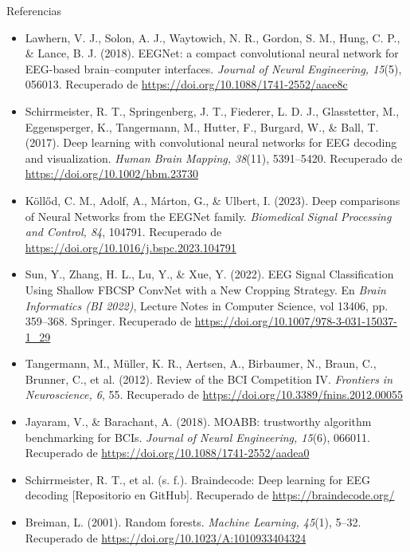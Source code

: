 \documentclass{beamer}
\begin{document}
\begin{frame}[allowframebreaks]{Referencias}
\small
\begin{itemize}
  \item Lawhern, V. J., Solon, A. J., Waytowich, N. R., Gordon, S. M., Hung, C. P., \& Lance, B. J. (2018). EEGNet: a compact convolutional neural network for EEG-based brain–computer interfaces. \emph{Journal of Neural Engineering, 15}(5), 056013. Recuperado de \url{https://doi.org/10.1088/1741-2552/aace8c}

  \item Schirrmeister, R. T., Springenberg, J. T., Fiederer, L. D. J., Glasstetter, M., Eggensperger, K., Tangermann, M., Hutter, F., Burgard, W., \& Ball, T. (2017). Deep learning with convolutional neural networks for EEG decoding and visualization. \emph{Human Brain Mapping, 38}(11), 5391–5420. Recuperado de \url{https://doi.org/10.1002/hbm.23730}

  \item Köllőd, C. M., Adolf, A., Márton, G., \& Ulbert, I. (2023). Deep comparisons of Neural Networks from the EEGNet family. \emph{Biomedical Signal Processing and Control, 84}, 104791. Recuperado de \url{https://doi.org/10.1016/j.bspc.2023.104791}

  \item Sun, Y., Zhang, H. L., Lu, Y., \& Xue, Y. (2022). EEG Signal Classification Using Shallow FBCSP ConvNet with a New Cropping Strategy. En \emph{Brain Informatics (BI 2022)}, Lecture Notes in Computer Science, vol 13406, pp. 359–368. Springer. Recuperado de \url{https://doi.org/10.1007/978-3-031-15037-1_29}

  \item Tangermann, M., Müller, K. R., Aertsen, A., Birbaumer, N., Braun, C., Brunner, C., et al. (2012). Review of the BCI Competition IV. \emph{Frontiers in Neuroscience, 6}, 55. Recuperado de \url{https://doi.org/10.3389/fnins.2012.00055}

  \item Jayaram, V., \& Barachant, A. (2018). MOABB: trustworthy algorithm benchmarking for BCIs. \emph{Journal of Neural Engineering, 15}(6), 066011. Recuperado de \url{https://doi.org/10.1088/1741-2552/aadea0}

  \item Schirrmeister, R. T., et al. (s. f.). Braindecode: Deep learning for EEG decoding [Repositorio en GitHub]. Recuperado de \url{https://braindecode.org/}

  \item Breiman, L. (2001). Random forests. \emph{Machine Learning, 45}(1), 5–32. Recuperado de \url{https://doi.org/10.1023/A:1010933404324}


\end{itemize}
\end{frame}
\end{document}
